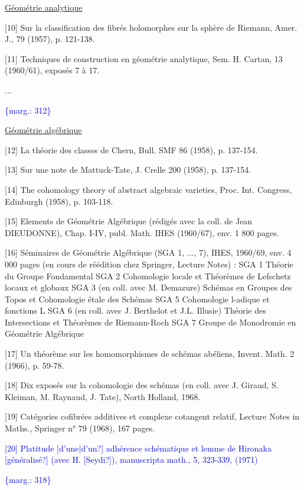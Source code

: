 \documentclass[11pt]{article}
\newcommand{\scanpage}[1]{\par\bigskip\noindent{\small\sffamily[scan #1]}\par}
\newcommand{\mspage}[1]{{\small\sffamily[p.\,#1]}}
\newcommand{\hand}[1]{\textcolor{blue}{#1}}
\newcommand{\margin}[1]{\textcolor{blue}{\{\textsf{marg.:} #1\}}}
\newcommand{\uline}[1]{\underline{#1}}
\newcommand{\unsure}[1]{[#1?]}
\begin{document}
\uline{Géométrie analytique}

[10] Sur la classification des fibrés holomorphes sur la
sphère de Riemann, Amer. J., 79 (1957), p. 121-138.

[11] Techniques de construction en géométrie analytique,
Sem. H. Cartan, 13 (1960/61), exposés 7 à 17.

...

\margin{312}

\clearpage
\scanpage{119/313}
\mspage{-4-}

\uline{Géométrie algébrique}

[12] La théorie des classes de Chern, Bull. SMF 86
(1958), p. 137-154.

[13] Sur une note de Mattuck-Tate, J. Crelle 200
(1958), p. 137-154.

[14] The cohomology theory of abstract algebraic
varieties, Proc. Int. Congress, Edinburgh
(1958), p. 103-118.

[15] Elements de Géométrie Algébrique (rédigés avec
la coll. de Jean DIEUDONNE), Chap. I-IV, publ.
Math. IHES (1960/67), env. 1 800 pages.

[16] Séminaires de Géométrie Algébrique (SGA 1, ...,
7), IHES, 1960/69, env. 4 000 pages (en cours
de réédition chez Springer, Lecture Notes) :
SGA 1 Théorie du Groupe Fondamental
SGA 2 Cohomologie locale et Théorèmes de Lefschetz
locaux et globaux
SGA 3 (en coll. avec M. Demazure) Schémas en Groupes
des Topos et Cohomologie étale des Schémas
SGA 5 Cohomologie l-adique et fonctions L
SGA 6 (en coll. avec J. Berthelot et J.L. Illusie)
Théorie des Intersections et Théorèmes de
Riemann-Roch
SGA 7 Groupe de Monodromie en Géométrie Algébrique

[17] Un théorème sur les homomorphismes de schémas
abéliens, Invent. Math. 2 (1966), p. 59-78.

[18] Dix exposés sur la cohomologie des schémas
(en coll. avec J. Giraud, S. Kleiman,
M. Raynaud, J. Tate), North Holland, 1968.

[19] Catégories cofibrées additives et complexe
cotangent relatif, Lecture Notes in Maths.,
Springer n° 79 (1968), 167 pages.

\hand{[20] Platitude \unsure{d'une|d'un} adhérence schématique}
\hand{et lemme de Hironaka \unsure{généralisé} (avec}
\hand{H. \unsure{Seydi}), manuscripta math., 5, 323-339,}
\hand{(1971)}

\margin{318}
\end{document}
